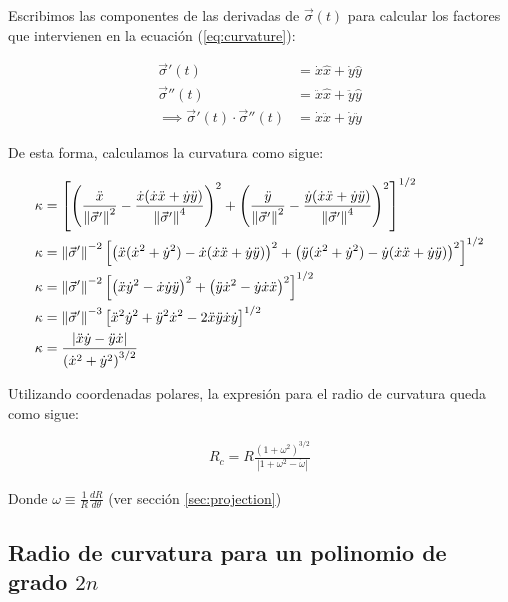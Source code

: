 Escribimos las componentes de las derivadas de $\vec{\sigma}(t)$ para calcular los factores que intervienen en la
ecuación (\ref{eq:curvature}):

\begin{align} 
  \vec{\sigma}'(t) &= \dot{x}\hat{x} + \dot{y} \hat{y} \\
  \vec{\sigma}''(t) &= \ddot{x} \hat{x} +  \ddot{y} \hat{y} \\
  \implies \vec{\sigma}'(t)\cdot\vec{\sigma}''(t) &= \dot{x}\ddot{x} + \dot{y}\ddot{y}
\end{align}

De esta forma, calculamos la curvatura como sigue:

\begin{align}
  \kappa &= \left[\left(\frac{\ddot{x}}{\left\lVert\vec{\sigma}'\right\rVert^2} - \frac{\dot{x}(\dot{x}\ddot{x} + \dot{y}\ddot{y})}{\left\lVert\vec{\sigma}'\right\rVert^4}\right)^2
  + \left(\frac{\ddot{y}}{\left\lVert\vec{\sigma}'\right\rVert^2} - \frac{\dot{y}(\dot{x}\ddot{x} + \dot{y}\ddot{y})}{\left\lVert\vec{\sigma}'\right\rVert^4} 
\right)^2\right]^{1/2} \\
 \kappa  &= \left\lVert\vec{\sigma}'\right\rVert^{-2}\left[\left(\ddot{x}(\dot{x}^2 + \dot{y}^2) - \dot{x}(\dot{x}\ddot{x} + \dot{y}\ddot{y})\right)^2
     + \left(\ddot{y}(\dot{x}^2 + \dot{y}^2) - \dot{y}(\dot{x}\ddot{x} + \dot{y}\ddot{y})\right)^2 \right]^{1/2}\\
 \kappa  &= \left\lVert\vec{\sigma}'\right\rVert^{-2}\left[\left(\ddot{x}\dot{y}^2 - \dot{x}\dot{y}\ddot{y}\right)^2 +
   \left(\ddot{y}\dot{x}^2 - \dot{y}\dot{x}\ddot{x}\right)^2 \right]^{1/2} \\
 \kappa  &=\left\lVert\vec{\sigma}'\right\rVert^{-3}\left[\ddot{x}^2\dot{y}^2 + \ddot{y}^2\dot{x}^2 - 2\ddot{x}\ddot{y}\dot{x}\dot{y}\right]^{1/2} \\
\kappa &= \frac{\left|\ddot{x}\dot{y} - \ddot{y}\dot{x}\right|}{\left(\dot{x}^2+\dot{y}^2\right)^{3/2}} 
\end{align}

Utilizando coordenadas polares, la expresión para el radio de curvatura queda como sigue:

\begin{align}
R_c = R\frac{\left(1 + \omega^2\right)^{3/2}}{\left|1 + \omega^2 - \dot{\omega}\right|}\label{eq:Rc-generic}
\end{align}

Donde $\omega \equiv \frac{1}{R}\frac{dR}{d\theta}$ (ver sección \ref{sec:projection})

\subsection{Radio de curvatura para un polinomio de grado $2n$}
\label{app:curvature-radius-poly}

